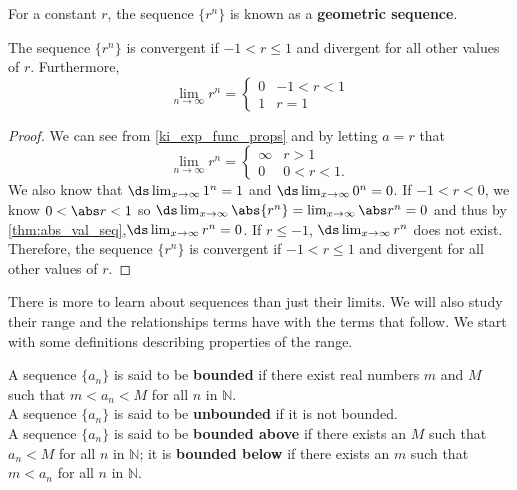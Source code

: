 
\begin{definition}\label{def:geom_seq}
For a constant $r$, the sequence $\{r^n\}$ is known as a \textbf{geometric sequence}.
\end{definition}

\begin{theorem}\label{thm:geom_seq}
The sequence $\{r^n\}$ is convergent if $-1<r\leq 1$ and divergent for all other values of $r$.  Furthermore,
\[
\lim_{n\to \infty} r^n=\begin{cases} 
0&  -1<r<1\\
1& r=1
\end{cases}\]
\end{theorem}

\begin{proof}
We can see from \autoref{ki_exp_func_props} and by letting $a=r$ that
\[
\lim_{n\to \infty} r^n =
\begin{cases}
\infty &  r>1\\
0 & 0<r<1.
\end{cases}
\]
We also know that $\ds  \lim_{x\to \infty} 1^n=1$ and $\ds  \lim_{x\to \infty} 0^n=0$. If $-1<r<0$, we know $0<\abs r<1$ so $\ds \lim_{x\to \infty}\abs{r^n}=\lim_{x\to \infty}\abs r^n=0$ and thus by \autoref{thm:abs_val_seq},$\ds \lim_{x\to \infty} r^n=0$. If $r\le-1$, $\ds \lim_{x\to \infty} r^n$ does not exist. Therefore, the sequence $\{ r^n\}$ is convergent if $-1<r\leq 1$ and divergent for all other values of $r$.
\end{proof}



There is more to learn about sequences than just their limits. We will also study their range and the relationships terms have with the terms that follow. We start with some definitions describing properties of the range.

\begin{definition}\label{def:bounded}
A sequence $\{a_n\}$ is said to be \textbf{bounded} if there exist real numbers $m$ and $M$ such that $m < a_n < M$ for all $n$ in $\mathbb{N}$.\\

A sequence $\{a_n\}$ is said to be \textbf{unbounded} if it is not bounded.\\

A sequence $\{a_n\}$ is said to be \textbf{bounded above} if there exists an $M$ such that $a_n < M$ for all $n$ in $\mathbb{N}$; it is \textbf{bounded below} if there exists an $m$ such that $m<a_n$ for all $n$ in $\mathbb{N}$.
\end{definition}

